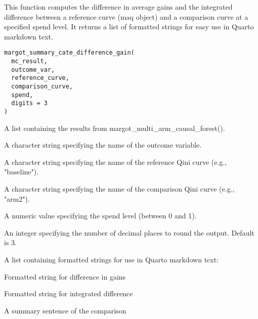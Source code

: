 \documentclass[a4paper]{book}
\begin{document}
%
\begin{Description}
This function computes the difference in average gains and the integrated difference
between a reference curve (maq object) and a comparison curve at a specified spend level.
It returns a list of formatted strings for easy use in Quarto markdown text.
\end{Description}
%
\begin{Usage}
\begin{verbatim}
margot_summary_cate_difference_gain(
  mc_result,
  outcome_var,
  reference_curve,
  comparison_curve,
  spend,
  digits = 3
)
\end{verbatim}
\end{Usage}
%
\begin{Arguments}
\begin{ldescription}
\item[\code{mc\_result}] A list containing the results from margot\_multi\_arm\_causal\_forest().

\item[\code{outcome\_var}] A character string specifying the name of the outcome variable.

\item[\code{reference\_curve}] A character string specifying the name of the reference Qini curve (e.g., "baseline").

\item[\code{comparison\_curve}] A character string specifying the name of the comparison Qini curve (e.g., "arm2").

\item[\code{spend}] A numeric value specifying the spend level (between 0 and 1).

\item[\code{digits}] An integer specifying the number of decimal places to round the output. Default is 3.
\end{ldescription}
\end{Arguments}
%
\begin{Value}
A list containing formatted strings for use in Quarto markdown text:
\begin{ldescription}
\item[\code{diff\_gain}] Formatted string for difference in gains
\item[\code{int\_diff}] Formatted string for integrated difference
\item[\code{summary}] A summary sentence of the comparison
\end{ldescription}
\end{Value}
\end{document}
